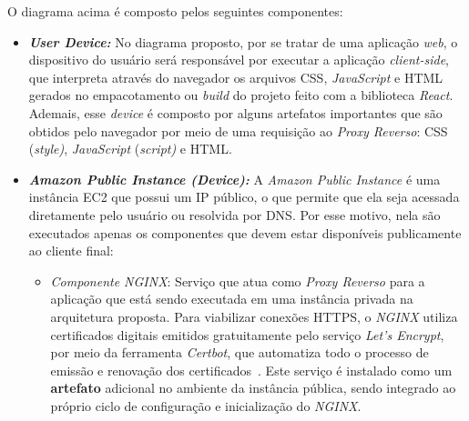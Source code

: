 O diagrama acima é composto pelos seguintes componentes:
\begin{itemize}
  \item \textbf{\textit{User Device:}} No diagrama proposto, por se tratar de uma aplicação \emph{web}, o dispositivo do usuário será responsável por executar a aplicação \textit{client-side}, que interpreta através do navegador os arquivos CSS, \emph{JavaScript} e HTML gerados no empacotamento ou \textit{build} do projeto feito com a biblioteca \emph{React}. Ademais, esse \textit{device} é composto por alguns artefatos importantes que são obtidos pelo navegador por meio de uma requisição ao \textit{Proxy Reverso}: CSS (\emph{style)}, \emph{JavaScript} (\emph{script)} e HTML.

  \item \textbf{\textit{Amazon Public Instance (Device):}} A \textit{Amazon Public Instance} é uma instância EC2 que possui um IP público, o que permite que ela seja acessada diretamente pelo usuário ou resolvida por DNS. Por esse motivo, nela são executados apenas os componentes que devem estar disponíveis publicamente ao cliente final:
    \begin{itemize}
      \item \textit{Componente NGINX}: Serviço que atua como \textit{Proxy Reverso} para a aplicação que está sendo executada em uma instância privada na arquitetura proposta. Para viabilizar conexões HTTPS, o \emph{NGINX} utiliza certificados digitais emitidos gratuitamente pelo serviço \emph{Let's Encrypt}, por meio da ferramenta \emph{Certbot}, que automatiza todo o processo de emissão e renovação dos certificados~\cite{LetsEncryptWithCertbot}. Este serviço é instalado como um \textbf{artefato} adicional no ambiente da instância pública, sendo integrado ao próprio ciclo de configuração e inicialização do \emph{NGINX}.
    \end{itemize}


\end{itemize}
